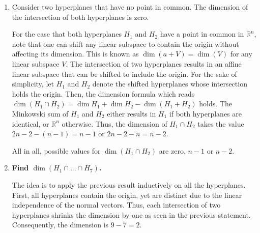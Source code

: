 \documentclass[fontsize=11pt, paper=a4]{scrartcl}
\begin{document}

\head{\sheetno}


\begin{enumerate}[label=(\alph*)]
    \item Consider two hyperplanes that have no point in common. The dimension of the intersection of both hyperplanes is zero.

    For the case that both hyperplanes $H_1$ and $H_2$ have a point in common in $\mathbb R^n$, note that one can shift any linear subspace to contain the origin without affecting its dimension. This is known as $\dim(a + V) = \dim(V)$ for any linear subspace $V$. The intersection of two hyperplanes results in an affine linear subspace that can be shifted to include the origin. For the sake of simplicity, let $H_1$ and $H_2$ denote the shifted hyperplanes whose intersection holds the origin. Then, the dimension formula which reads $\dim(H_1 \cap H_2) = \dim H_1 + \dim H_2 - \dim (H_1+H_2)$ holds. The Minkowski sum of $H_1$ and $H_2$ either results in $H_1$ if both hyperplanes are identical, or $\mathbb R^n$ otherwise. Thus, the dimension of $H_1 \cap H_2$ takes the value $2n - 2 - (n - 1) = n-1$ or $2n - 2 - n = n- 2$.

    All in all, possible values for $\dim(H_1 \cap H_2)$ are zero, $n-1$ or $n-2$.


    \item \textbf{Find $\dim(H_1 \cap ... \cap H_7)$.}

    The idea is to apply the previous result inductively on all the hyperplanes. First, all hyperplanes contain the origin, yet are distinct due to the linear independence of the normal vectors. Thus, each intersection of two hyperplanes shrinks the dimension by one as seen in the previous statement. Consequently, the dimension is $9 - 7 = 2$.
\end{enumerate}




\end{document}
